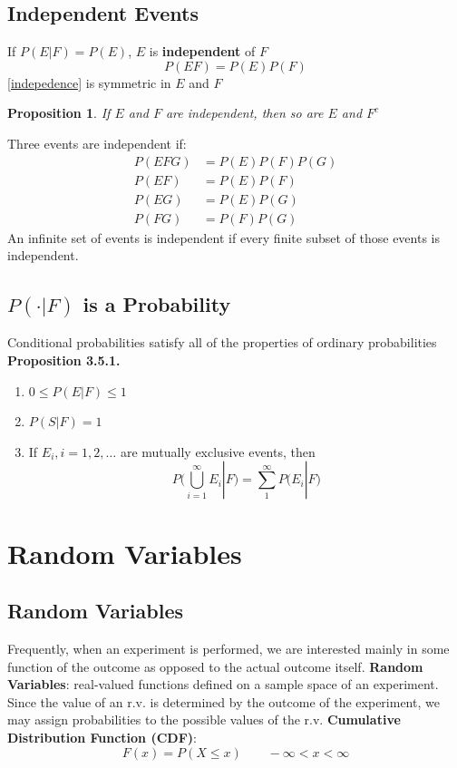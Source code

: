 \documentclass[openany]{book}
\numberwithin{equation}{section}
\newtheorem{proposition}{Proposition}[section]
\begin{document}
\begin{flushleft}
\section{Independent Events}
If $P(E|F)=P(E)$, $E$ is \textbf{independent} of $F$
\begin{equation}
\label{indepedence}
P(EF)=P(E)P(F)
\end{equation}
\ref{indepedence} is symmetric in $E$ and $F$
\begin{proposition}
If $E$ and $F$ are independent, then so are $E$ and $F^c$
\end{proposition}
Three events are independent if:
\begin{align*}
P(EFG)&=P(E)P(F)P(G)\\
P(EF)&=P(E)P(F)\\
P(EG)&=P(E)P(G)\\
P(FG)&=P(F)P(G)
\end{align*}
An infinite set of events is independent if every finite subset of those events is independent.
\section{$P(\cdot|F)$ is a Probability}
Conditional probabilities satisfy all of the properties of ordinary probabilities \medbreak
\textbf{Proposition 3.5.1.}
\begin{enumerate}
\item $0\leq P(E|F) \leq 1$
\item $P(S|F)=1$
\item  If $E_i,i=1,2,\dots$ are mutually exclusive events, then
\[P\bigg(\bigcup_{i=1}^{\infty}E_i|F)= \sum_{1}^{\infty}P(E_i|F \bigg)
\]
\end{enumerate}
\chapter{Random Variables}
\section{Random Variables}
Frequently, when an experiment is performed, we are interested mainly in some function of the outcome as opposed to the actual outcome itself. \medbreak
\textbf{Random Variables}: real-valued functions defined on a sample space of an experiment.\medbreak
Since the value of an r.v. is determined by the outcome of the experiment, we may assign probabilities to the possible values of the r.v.\medbreak
\textbf{Cumulative Distribution Function (CDF)}:
\[F(x)=P(X\leq x) \qquad -\infty<x<\infty
\]

\end{flushleft}
\end{document}
